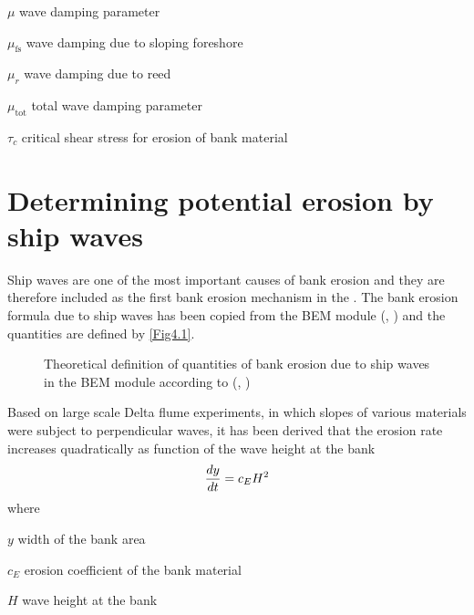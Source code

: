 \begin{symbollist}
\item[$\mu$] wave damping parameter 
\item[$\mu_\text{fs}$] wave damping due to sloping foreshore 
\item[$\mu_r$] wave damping due to reed 
\item[$\mu_\text{tot}$] total wave damping parameter 
\item[$\tau_c$] critical shear stress for erosion of bank material 
\end{symbollist}

\section{Determining potential erosion by ship waves} \label{Sec4.1}

Ship waves are one of the most important causes of bank erosion \citep{Verheij00} and they are therefore included as the first bank erosion mechanism in the \dfastbe.
The bank erosion formula due to ship waves has been copied from the BEM module (\citet{Verheij00}, \citet{StolkerV01b}) and the quantities are defined by \autoref{Fig4.1}.

\begin{figure}[!h]
\center
\resizebox{10cm}{!}{
   
}
\caption{Theoretical definition of quantities of bank erosion due to ship waves in the BEM module according to (\citet{Verheij00}, \citet{StolkerV01b})}
\label{Fig4.1}
\end{figure}

Based on large scale Delta flume experiments, in which slopes of various materials were subject to perpendicular waves, it has been derived that the erosion rate increases quadratically as function of the wave height at the bank
%
\begin{equation}
\diff{y}{t} = c_E H^2
\label{Eq1.1}
\end{equation}
%
where
%
\begin{symbollist}
\item[$y$] width of the bank area 
\item[$c_E$] erosion coefficient of the bank material 
\item[$H$] wave height at the bank 
\end{symbollist}

